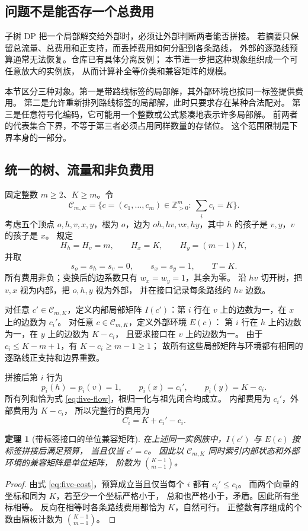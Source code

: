 \documentclass[UTF8,a4paper,11pt,fontset=fandol]{ctexart}
\newtheorem{theorem}{定理}[section]
\theoremstyle{definition}
\newcommand{\Z}{\mathbb Z}
\begin{document}
\subsection{问题不是能否存一个总费用}

子树 DP 把一个局部解交给外部时，必须让外部判断两者能否拼接。
若摘要只保留总流量、总费用和正支持，而丢掉费用如何分配到各条路线，
外部的逐路线预算通常无法恢复。仓库已有具体分离反例；
本节进一步把这种现象组织成一个可任意放大的实例族，
从而计算补全等价类和兼容矩阵的规模。

本节区分三种对象。第一是带路线标签的局部解，其外部环境也按同一标签提供费用。
第二是允许重新排列路线标签的局部解，此时只要求存在某种合法配对。
第三是任意符号化编码，它可能用一个整数或公式紧凑地表示许多局部解。
前两者的代表集合下界，不等于第三者必须占用同样数量的存储位。
这个范围限制是下界本身的一部分。

\subsection{统一的树、流量和非负费用}

固定整数 $m\ge2$、$K\ge m$。令
\[
\mathcal C_{m,K}
=\{c=(c_1,\ldots,c_m)\in\Z_{>0}^m:\ \sum_i c_i=K\}.
\]
考虑五个顶点 $o,h,v,x,y$，根为 $o$，边为
$oh,hv,vx,hy$，其中 $h$ 的孩子是 $v,y$，$v$ 的孩子是 $x$。
规定
\begin{equation}\label{eq:five-flow}
H_h=H_v=m,\qquad H_x=K,\qquad H_y=(m-1)K,
\end{equation}
并取
\[
s_o=s_h=s_v=0,\qquad s_x=s_y=1,\qquad T=K.
\]
所有费用非负；变换后的边系数只有 $w_x=w_y=1$，其余为零。
沿 $hv$ 切开树，把 $v,x$ 视为内部，把 $o,h,y$ 视为外部，
并在接口记录每条路线的 $hv$ 边数。

对任意 $c'\in\mathcal C_{m,K}$，定义内部局部矩阵
$I(c')$：第 $i$ 行在 $v$ 上的边数为一，在 $x$ 上的边数为 $c_i'$。
对任意 $c\in\mathcal C_{m,K}$，定义外部环境 $E(c)$：
第 $i$ 行在 $h$ 上的边数为一，在 $y$ 上的边数为 $K-c_i$，
且要求接口在 $v$ 上的边数为一。
由于 $c_i\le K-m+1$，有 $K-c_i\ge m-1\ge1$；
故所有这些局部矩阵与环境都有相同的逐路线正支持和边界重数。

拼接后第 $i$ 行为
\[
p_i(h)=p_i(v)=1,\qquad p_i(x)=c_i',\qquad
p_i(y)=K-c_i.
\]
所有列和恰为式 \eqref{eq:five-flow}，根归一化与祖先闭合均成立。
内部费用为 $c_i'$，外部费用为 $K-c_i$，
所以完整行的费用为
\begin{equation}\label{eq:five-cost}
C_i=K+c_i'-c_i.
\end{equation}

\begin{theorem}[带标签接口的单位兼容矩阵]\label{thm:identity}
在上述同一实例族中，$I(c')$ 与 $E(c)$ 按标签拼接后满足预算，
当且仅当 $c'=c$。
因此以 $\mathcal C_{m,K}$ 同时索引内部状态和外部环境的兼容矩阵是单位矩阵，
阶数为 $\binom{K-1}{m-1}$。
\end{theorem}
\begin{proof}
由式 \eqref{eq:five-cost}，预算成立当且仅当每个 $i$ 都有 $c_i'\le c_i$。
而两个向量的坐标和同为 $K$，若至少一个坐标严格小于，
总和也严格小于，矛盾。因此所有坐标相等。
反向在相等时各条路线费用都恰为 $K$，自然可行。
正整数有序组成的个数由隔板计数为 $\binom{K-1}{m-1}$。
\end{proof}
\end{document}
